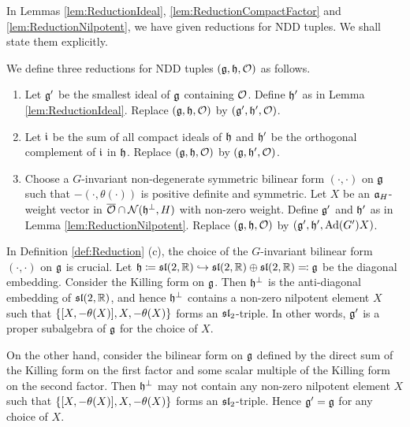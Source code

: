 In Lemmas \ref{lem:ReductionIdeal}, \ref{lem:ReductionCompactFactor} and \ref{lem:ReductionNilpotent}, we have given reductions for NDD tuples.
We shall state them explicitly.

\begin{definition}\label{def:Reduction}
	We define three reductions for NDD tuples $(\mathfrak{g}, \mathfrak{h}, \mathcal{O})$ as follows.
	\begin{enumerate}[label=(\alph*)]
		\item Let $\mathfrak{g}'$ be the smallest ideal of $\mathfrak{g}$ containing $\mathcal{O}$.
		Define $\mathfrak{h}'$ as in Lemma \ref{lem:ReductionIdeal}.
		Replace $(\mathfrak{g}, \mathfrak{h}, \mathcal{O})$ by $(\mathfrak{g'}, \mathfrak{h'}, \mathcal{O})$.
		\item Let $\mathfrak{i}$ be the sum of all compact ideals of $\mathfrak{h}$ and $\mathfrak{h'}$ be the orthogonal complement of $\mathfrak{i}$ in $\mathfrak{h}$.
		Replace $(\mathfrak{g}, \mathfrak{h}, \mathcal{O})$ by $(\mathfrak{g}, \mathfrak{h'}, \mathcal{O})$.
		\item Choose a $G$-invariant non-degenerate symmetric bilinear form $(\cdot, \cdot)$ on $\mathfrak{g}$ such that $-(\cdot, \theta(\cdot))$ is positive definite and symmetric.
		Let $X$ be an $\mathfrak{a}_H$-weight vector in $\overline{\mathcal{O}} \cap \mathcal{N}(\mathfrak{h}^\perp, H)$ with non-zero weight.
		Define $\mathfrak{g'}$ and $\mathfrak{h'}$ as in Lemma \ref{lem:ReductionNilpotent}.
		Replace $(\mathfrak{g}, \mathfrak{h}, \mathcal{O})$ by $(\mathfrak{g'}, \mathfrak{h'}, \mathrm{Ad}(G')X)$.
	\end{enumerate}
\end{definition}

\begin{remark} \label{remark:minimal}
	In Definition \ref{def:Reduction} (c), the choice of the $G$-invariant bilinear form $(\cdot, \cdot)$ on $\mathfrak{g}$ is crucial.
	Let $\mathfrak{h} \coloneq \mathfrak{sl}(2,\mathbb{R}) \hookrightarrow \mathfrak{sl}(2,\mathbb{R})\oplus \mathfrak{sl}(2,\mathbb{R}) \eqcolon \mathfrak{g}$ be the diagonal embedding.
	Consider the Killing form on $\mathfrak{g}$.
	Then $\mathfrak{h}^\perp$ is the anti-diagonal embedding of $\mathfrak{sl}(2,\mathbb{R})$, and hence $\mathfrak{h}^\perp$ contains a non-zero nilpotent element $X$ such that $\left\{[X, -\theta(X)], X, -\theta(X) \right\}$ forms an $\mathfrak{sl}_2$-triple.
	In other words, $\mathfrak{g}'$ is a proper subalgebra of $\mathfrak{g}$ for the choice of $X$.
	
	On the other hand, consider the bilinear form on $\mathfrak{g}$ defined by the direct sum of the Killing form on the first factor and some scalar multiple of the Killing form on the second factor.
	Then $\mathfrak{h}^\perp$ may not contain any non-zero nilpotent element $X$ such that $\left\{[X, -\theta(X)], X, -\theta(X) \right\}$ forms an $\mathfrak{sl}_2$-triple.
	Hence $\mathfrak{g}' = \mathfrak{g}$ for any choice of $X$.
\end{remark}

